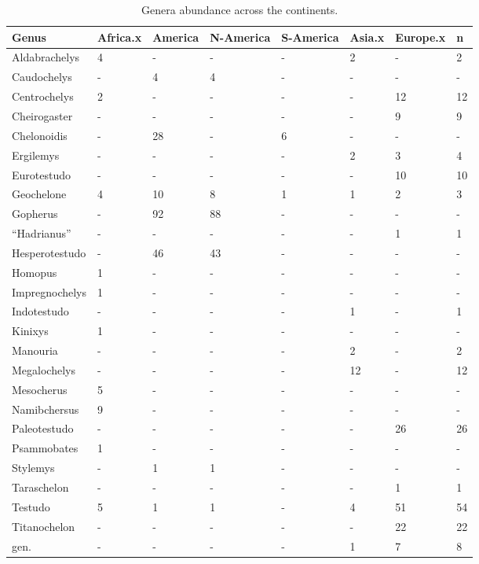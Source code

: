 \begin{longtable}[]{@{}llllllll@{}}
	\caption{Genera abundance across the continents.}
	\label{tab:SAC}
	\toprule
	Genus & Africa.x & America & N-America & S-America & Asia.x & Europe.x &
	n\tabularnewline
	\midrule
	\endhead
	Aldabrachelys & 4 & - & - & - & 2 & - & 2\tabularnewline
	Caudochelys & - & 4 & 4 & - & - & - & -\tabularnewline
	Centrochelys & 2 & - & - & - & - & 12 & 12\tabularnewline
	Cheirogaster & - & - & - & - & - & 9 & 9\tabularnewline
	Chelonoidis & - & 28 & - & 6 & - & - & -\tabularnewline
	Ergilemys & - & - & - & - & 2 & 3 & 4\tabularnewline
	Eurotestudo & - & - & - & - & - & 10 & 10\tabularnewline
	Geochelone & 4 & 10 & 8 & 1 & 1 & 2 & 3\tabularnewline
	Gopherus & - & 92 & 88 & - & - & - & -\tabularnewline
	``Hadrianus'' & - & - & - & - & - & 1 & 1\tabularnewline
	Hesperotestudo & - & 46 & 43 & - & - & - & -\tabularnewline
	Homopus & 1 & - & - & - & - & - & -\tabularnewline
	Impregnochelys & 1 & - & - & - & - & - & -\tabularnewline
	Indotestudo & - & - & - & - & 1 & - & 1\tabularnewline
	Kinixys & 1 & - & - & - & - & - & -\tabularnewline
	Manouria & - & - & - & - & 2 & - & 2\tabularnewline
	Megalochelys & - & - & - & - & 12 & - & 12\tabularnewline
	Mesocherus & 5 & - & - & - & - & - & -\tabularnewline
	Namibchersus & 9 & - & - & - & - & - & -\tabularnewline
	Paleotestudo & - & - & - & - & - & 26 & 26\tabularnewline
	Psammobates & 1 & - & - & - & - & - & -\tabularnewline
	Stylemys & - & 1 & 1 & - & - & - & -\tabularnewline
	Taraschelon & - & - & - & - & - & 1 & 1\tabularnewline
	Testudo & 5 & 1 & 1 & - & 4 & 51 & 54\tabularnewline
	Titanochelon & - & - & - & - & - & 22 & 22\tabularnewline
	gen. & - & - & - & - & 1 & 7 & 8\tabularnewline
	\bottomrule
\end{longtable}
